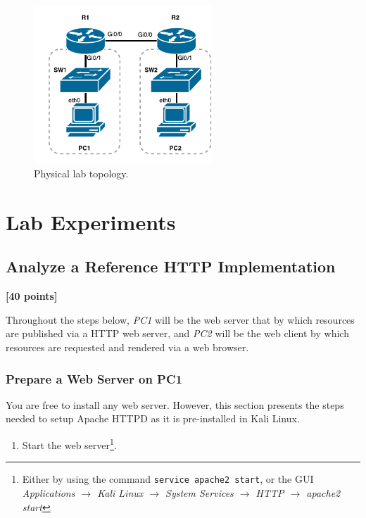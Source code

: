 \documentclass[pdftex,12pt,a4paper]{article}
\begin{document}
        \begin{figure}[tbh]
            \centering
            \includegraphics[width=0.6\textwidth]{figures/labtop}
            \caption{Physical lab topology.}
            \label{fig:labtop}
        \end{figure}

    \section{Lab Experiments}
        \subsection{Analyze a Reference HTTP Implementation}
            \begin{flushright}
                \textbf{[40 points]}
            \end{flushright}

            Throughout the steps below, \emph{PC1} will be the web server that
            by which resources are published via a HTTP web server, and
            \emph{PC2} will be the web client by which resources are requested
            and rendered via a web browser.
            
            \subsubsection{Prepare a Web Server on PC1}
                You are free to install any web server. However, this section
                presents the steps needed to setup Apache HTTPD as it is
                pre-installed in Kali Linux.

                \begin{enumerate}
                    \item Start the web server\footnote{Either by using the
                        command \texttt{service apache2 start}, or the GUI
                        \emph{Applications $\rightarrow$ Kali Linux
                        $\rightarrow$ System Services $\rightarrow$ HTTP
                        $\rightarrow$ apache2 start}}.
                \end{enumerate}
\end{document}
